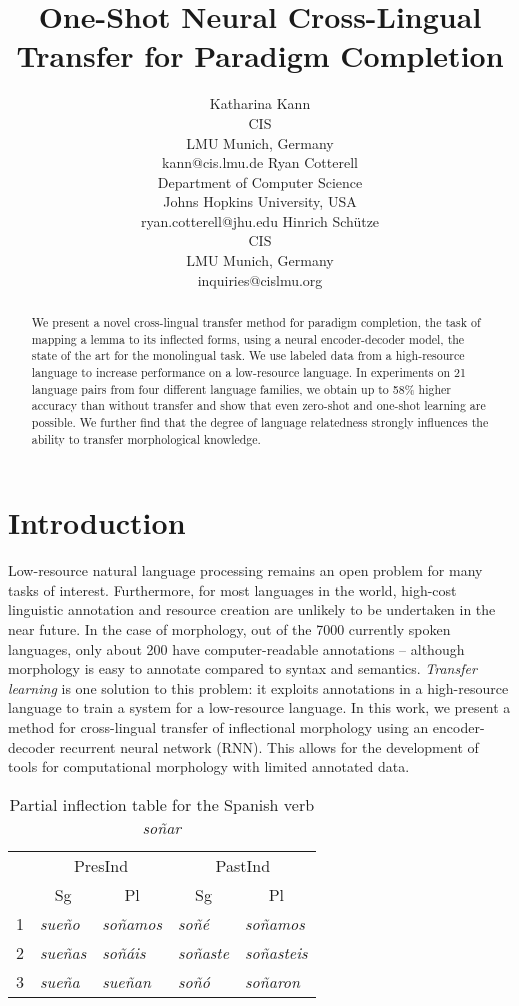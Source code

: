\documentclass[11pt,letterpaper]{article}
\title{One-Shot Neural Cross-Lingual Transfer for Paradigm Completion}
\author{Katharina Kann \\ CIS \\  LMU Munich, Germany\\ kann@cis.lmu.de
        \And  Ryan Cotterell \\ Department of Computer Science \\ Johns Hopkins University, USA \\  ryan.cotterell@jhu.edu 
        \And Hinrich Sch\"utze \\ CIS \\  LMU Munich, Germany \\ inquiries@cislmu.org}
\date{}
\newcommand{\word}[1]{{\em #1}}
\newcommand{\mtag}[1]{{\small{\textsf{#1}}}}
\def\tablabel#1{\label{tab:#1}\label{p:#1}}
\begin{document}
\maketitle

\begin{abstract}
We present a novel cross-lingual transfer method for paradigm
completion, the task of mapping a lemma to its inflected
forms, using a neural encoder-decoder model, the state of the art for the monolingual task.
We use labeled data from a high-resource language to
increase performance on a low-resource language. In
experiments on 21 language pairs from four different
language families, we obtain up to 58\% higher accuracy than
without transfer and show that even zero-shot and one-shot
learning are possible.  We further find that the degree of
language relatedness strongly influences the ability to
transfer morphological knowledge.
\end{abstract}

\section{Introduction}
Low-resource natural language processing remains an open problem
for many tasks of interest. Furthermore, for most languages in the
world, high-cost linguistic annotation and resource creation are
unlikely to be undertaken in the near future. In the case of
morphology, out of the 7000 currently spoken \cite{Lewis_book_2009} languages,
only about 200 have computer-readable annotations \cite{sylak-glassmankirov2015a} -- although
morphology is easy to annotate compared to syntax and
semantics. {\em Transfer learning} 
is one solution to this problem:
it exploits annotations in a high-resource language
to train a system for a low-resource language. In this work, we
present a method for
cross-lingual transfer of inflectional morphology using an encoder-decoder
recurrent neural network (RNN). This allows for the development
of tools for computational morphology with limited annotated data.


\begin{table}
\small
\centering
\begin{tabular}{l|llll}
  & \multicolumn{2}{c}{\mtag{PresInd}} & \multicolumn{2}{c}{\mtag{PastInd}}\\
      & \multicolumn{1}{c}{\mtag{Sg}} & \multicolumn{1}{c}{\mtag{Pl}} & \multicolumn{1}{c}{\mtag{Sg}} & \multicolumn{1}{c}{\mtag{Pl}}  \\\hline
  \mtag{1} & \word{sue\~{n}o}         & \word{{so\~{n}amos}} & \word{so\~{n}\'{e}} & \word{so\~{n}amos} \\
  \mtag{2} & \word{sue\~{n}as} & \word{so\~{n}\'{a}is}  & \word{so\~{n}aste} & \word{so\~{n}asteis}  \\
  \mtag{3} & \word{sue\~{n}a}  & \word{sue\~{n}an} & \word{so\~{n}\'{o}} & \word{so\~{n}aron}
\end{tabular}
  \caption{Partial inflection table for the Spanish verb
    \word{so\~{n}ar}\tablabel{partial-paradigm1}}
\end{table}
\end{document}
